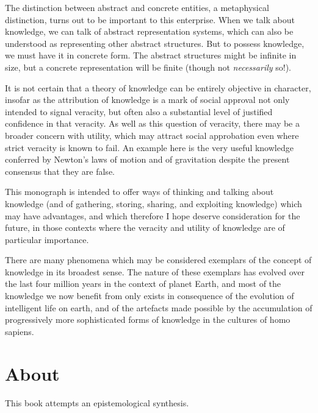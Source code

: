 \documentclass[10pt,titlepage]{book}
\begin{document}
The distinction between abstract and concrete entities, a metaphysical distinction, turns out to be important to this enterprise.
When we talk about knowledge, we can talk of abstract representation systems, which can also be understood as representing other abstract structures.
But to possess knowledge, we must have it in concrete form.
The abstract structures might be infinite in size, but a concrete representation will be finite (though not \emph{necessarily} so!).


  








It is not certain that a theory of knowledge can be entirely objective in character, insofar as the attribution of knowledge is a mark of social approval not only intended to signal veracity, but often also a substantial level of justified confidence in that veracity.
As well as this question of veracity, there may be a broader concern with utility, which may attract social approbation even where strict veracity is known to fail.
An example here is the very useful knowledge conferred by Newton's laws of motion and of gravitation despite the present consensus that they are false.

This monograph is intended to offer ways of thinking and talking about knowledge (and of gathering, storing, sharing, and exploiting knowledge)  which may have advantages, and which therefore I hope deserve consideration for the future, in those contexts where the veracity and utility of knowledge are of particular importance.

There are many phenomena which may be considered exemplars of the concept of knowledge in its broadest sense.
The nature of these exemplars has evolved over the last four million years in the context of planet Earth, and most of the knowledge we now benefit from only exists in consequence of the evolution of intelligent life on earth, and of the artefacts made possible by the accumulation of progressively more sophisticated forms of knowledge in the cultures of homo sapiens.

\section*{About}

This book attempts an epistemological synthesis.
\end{document}
